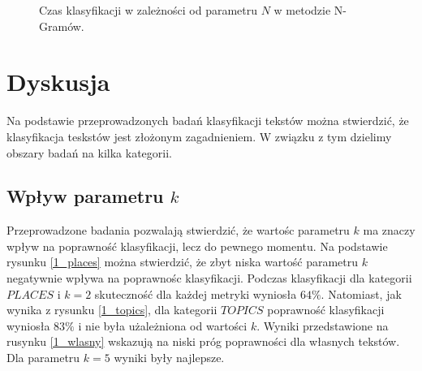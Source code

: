 \documentclass{classrep}
\begin{document}
\begin{figure}[h!]
    \begin{center}
    \end{center}
    \caption{Czas klasyfikacji w zależności od parametru $N$ w metodzie N-Gramów.}
    \label{n_gramn_czas}
\end{figure}



\section{Dyskusja}
Na podstawie przeprowadzonych badań klasyfikacji tekstów można stwierdzić, że klasyfikacja teskstów
jest złożonym zagadnieniem. W związku z tym dzielimy obszary badań na kilka kategorii.

\subsection{Wpływ parametru $k$}
Przeprowadzone badania pozwalają stwierdzić, że wartośc parametru $k$ ma znaczy wpływ na poprawność
klasyfikacji, lecz do pewnego momentu. Na podstawie rysunku \ref{1_places} można stwierdzić, że
zbyt niska wartość parametru $k$ negatywnie wpływa na poprawnośc klasyfikacji. Podczas klasyfikacji
dla kategorii $PLACES$ i $k=2$ skuteczność dla każdej metryki wyniosła $64\%$. Natomiast, jak wynika
z rysunku \ref{1_topics}, dla
kategorii $TOPICS$ poprawność klasyfikacji wyniosła $83\%$ i nie była użależniona od wartości $k$.
Wyniki przedstawione na rusynku \ref{1_wlasny} wskazują na niski próg poprawności dla własnych tekstów.
Dla parametru $k=5$ wyniki były najlepsze.
\end{document}
